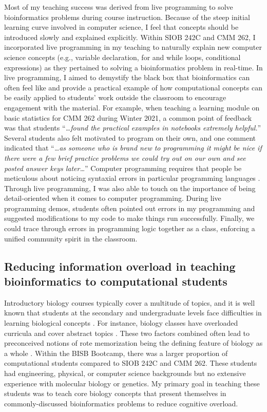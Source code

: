 Most of my teaching success was derived from live programming to solve bioinformatics problems during course instruction. Because of the steep initial learning curve involved in computer science, I feel that concepts should be introduced slowly and explained explicitly. Within SIOB 242C and CMM 262, I incorporated live programming in my teaching to naturally explain new computer science concepts (e.g., variable declaration, for and while loops, conditional expressions) as they pertained to solving a bioinformatics problem in real-time. In live programming, I aimed to demystify the black box that bioinformatics can often feel like and provide a practical example of how computational concepts can be easily applied to students' work outside the classroom to encourage engagement with the material. For example, when teaching a learning module on basic statistics for CMM 262 during Winter 2021, a common point of feedback was that students “\textit{…found the practical examples in notebooks extremely helpful.}” Several students also felt motivated to program on their own, and one comment indicated that “\textit{…as someone who is brand new to programming it might be nice if there were a few brief practice problems we could try out on our own and see posted answer keys later…}” Computer programming requires that people be meticulous about noticing syntaxial errors in particular programming languages \cite{sentance2015,rivers2016}. Through live programming, I was also able to touch on the importance of being detail-oriented when it comes to computer programming. During live programming demos, students often pointed out errors in my programming and suggested modifications to my code to make things run successfully. Finally, we could trace through errors in programming logic together as a class, enforcing a unified community spirit in the classroom. 

\subsection{Reducing information overload in teaching bioinformatics to computational students}

Introductory biology courses typically cover a multitude of topics, and it is well known that students at the secondary and undergraduate levels face difficulties in learning biological concepts \cite{bahar1999,lazarowitz1992,kelly-laubscher2016,anderson2022}. For instance, biology classes have overloaded curricula and cover abstract topics \cite{bahar1999,lazarowitz1992,anderson2022}. These two factors combined often lead to preconceived notions of rote memorization being the defining feature of biology as a whole \cite{bahar1999,mcdaniel2022}. Within the BISB Bootcamp, there was a larger proportion of computational students compared to SIOB 242C and CMM 262. These students had engineering, physical, or computer science backgrounds but no extensive experience with molecular biology or genetics. My primary goal in teaching these students was to teach core biology concepts that present themselves in commonly-discussed bioinformatics problems to reduce cognitive overload. 

